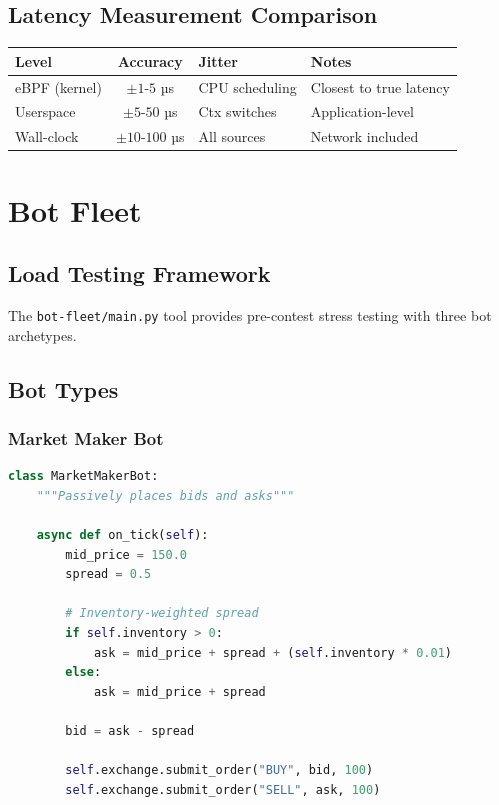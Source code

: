 \documentclass[10pt,a4paper,oneside]{report}
\begin{document}
\section{Latency Measurement Comparison}

\begin{table}[H]\small
    \centering
    \begin{tabular}{lcll}
    \toprule
    \textbf{Level} & \textbf{Accuracy} & \textbf{Jitter} & \textbf{Notes} \\
    \midrule
    eBPF (kernel) & $\pm 1$-$5$ µs & CPU scheduling & Closest to true latency \\
    Userspace & $\pm 5$-$50$ µs & Ctx switches & Application-level \\
    Wall-clock & $\pm 10$-$100$ µs & All sources & Network included \\
    \bottomrule
    \end{tabular}
\end{table}

\chapter{Bot Fleet}

\section{Load Testing Framework}

The \texttt{bot-fleet/main.py} tool provides pre-contest stress testing with three bot archetypes.

\section{Bot Types}

\subsection{Market Maker Bot}

\begin{lstlisting}[language=python]
class MarketMakerBot:
    """Passively places bids and asks"""

    async def on_tick(self):
        mid_price = 150.0
        spread = 0.5

        # Inventory-weighted spread
        if self.inventory > 0:
            ask = mid_price + spread + (self.inventory * 0.01)
        else:
            ask = mid_price + spread

        bid = ask - spread

        self.exchange.submit_order("BUY", bid, 100)
        self.exchange.submit_order("SELL", ask, 100)
\end{lstlisting}
\end{document}
